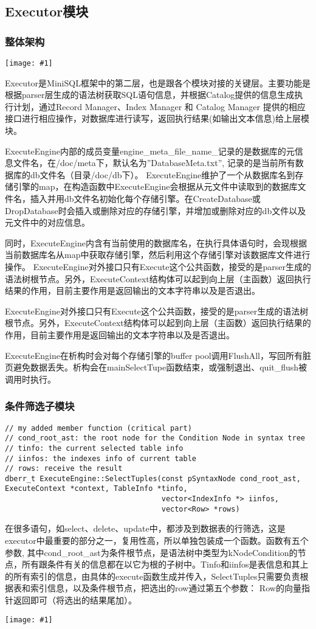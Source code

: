 \documentclass[12pt, a4paper]{article}
\def\ss#1{\subsection{#1}}
\def\sss#1{\subsubsection{#1}}
\def\p{\par}
\def\g#1{\begin{center}\texttt{[image: \#1]}\end{center}}
\begin{document}
\ss{Executor模块}
\sss{整体架构}
\g{imgs/executor_1.png}
\p Executor是MiniSQL框架中的第二层，也是跟各个模块对接的关键层。主要功能是根据parser层生成的语法树获取SQL语句信息，并根据Catalog提供的信息生成执行计划，通过Record Manager、Index Manager 和 Catalog Manager 提供的相应接口进行相应操作，对数据库进行读写，返回执行结果(如输出文本信息)给上层模块。
\p ExecuteEngine内部的成员变量engine\_meta\_file\_name\_记录的是数据库的元信息文件名，在/doc/meta下，默认名为”DatabaseMeta.txt”, 记录的是当前所有数据库的db文件名（目录/doc/db下）。 ExecuteEngine维护了一个从数据库名到存储引擎的map，在构造函数中ExecuteEngine会根据从元文件中读取到的数据库文件名，插入并用db文件名初始化每个存储引擎。在CreateDatabase或DropDatabase时会插入或删除对应的存储引擎，并增加或删除对应的db文件以及元文件中的对应信息。
\p 同时，ExecuteEngine内含有当前使用的数据库名，在执行具体语句时，会现根据当前数据库名从map中获取存储引擎，然后利用这个存储引擎对该数据库文件进行操作。
ExecuteEngine对外接口只有Execute这个公共函数，接受的是parser生成的语法树根节点。另外，ExecuteContext结构体可以起到向上层（主函数）返回执行结果的作用，目前主要作用是返回输出的文本字符串以及是否退出。
\p ExecuteEngine对外接口只有Execute这个公共函数，接受的是parser生成的语法树根节点。另外，ExecuteContext结构体可以起到向上层（主函数）返回执行结果的作用，目前主要作用是返回输出的文本字符串以及是否退出。
\p ExecuteEngine在析构时会对每个存储引擎的buffer pool调用FlushAll，写回所有脏页避免数据丢失。析构会在mainSelectTupe函数结束，或强制退出、quit\_flush被调用时执行。
\sss{条件筛选子模块}
\begin{lstlisting}[style=customc]
// my added member function (critical part)
// cond_root_ast: the root node for the Condition Node in syntax tree
// tinfo: the current selected table info
// iinfos: the indexes info of current table
// rows: receive the result
dberr_t ExecuteEngine::SelectTuples(const pSyntaxNode cond_root_ast, ExecuteContext *context, TableInfo *tinfo,
                                    vector<IndexInfo *> iinfos,
                                    vector<Row> *rows)
\end{lstlisting}
\p 在很多语句，如select、delete、update中，都涉及到数据表的行筛选，这是executor中最重要的部分之一，复用性高，所以单独包装成一个函数。函数有五个参数, 其中cond\_root\_ast为条件根节点，是语法树中类型为kNodeCondition的节点，所有跟条件有关的信息都在以它为根的子树中。Tinfo和iinfos是表信息和其上的所有索引的信息，由具体的execute函数生成并传入，SelectTuples只需要负责根据表和索引信息，以及条件根节点，把选出的row通过第五个参数：
Row的向量指针返回即可（将选出的结果尾加）。
\g{imgs/executor_2.png}
\end{document}
